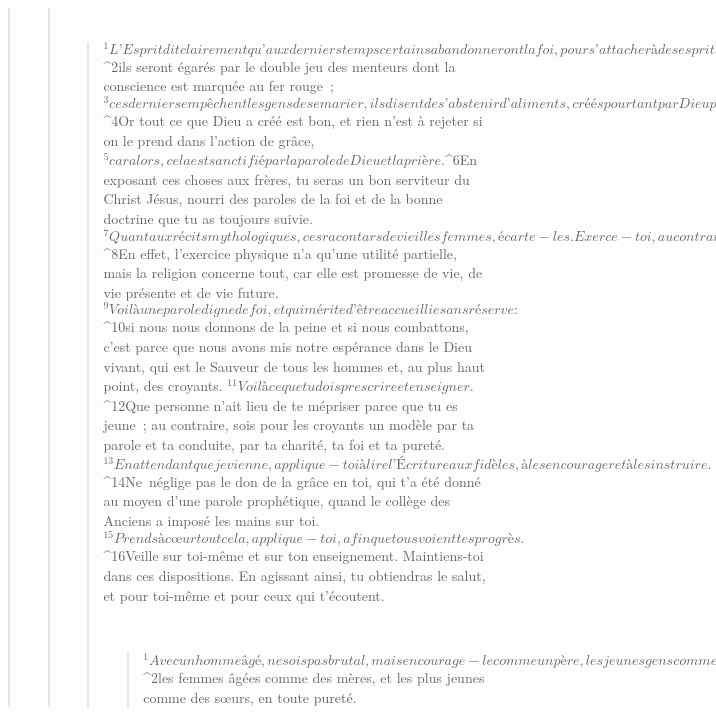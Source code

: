 \begin{verse}
\begin{verse}
         
      \bchapter{}
      \begin{verse}
${}^{1}L’Esprit dit clairement qu’aux derniers temps certains abandonneront la foi, pour s’attacher à des esprits trompeurs, à des doctrines démoniaques ; 
${}^{2}ils seront égarés par le double jeu des menteurs dont la conscience est marquée au fer rouge ; 
${}^{3}ces derniers empêchent les gens de se marier, ils disent de s’abstenir d’aliments, créés pourtant par Dieu pour être consommés dans l’action de grâce par ceux qui sont croyants et connaissent pleinement la vérité. 
${}^{4}Or tout ce que Dieu a créé est bon, et rien n’est à rejeter si on le prend dans l’action de grâce, 
${}^{5}car alors, cela est sanctifié par la parole de Dieu et la prière.
${}^{6}En exposant ces choses aux frères, tu seras un bon serviteur du Christ Jésus, nourri des paroles de la foi et de la bonne doctrine que tu as toujours suivie. 
${}^{7}Quant aux récits mythologiques, ces racontars de vieilles femmes, écarte-les. Exerce-toi, au contraire, à la piété. 
${}^{8}En effet, l’exercice physique n’a qu’une utilité partielle, mais la religion concerne tout, car elle est promesse de vie, de vie présente et de vie future. 
${}^{9}Voilà une parole digne de foi, et qui mérite d’être accueillie sans réserve : 
${}^{10}si nous nous donnons de la peine et si nous combattons, c’est parce que nous avons mis notre espérance dans le Dieu vivant, qui est le Sauveur de tous les hommes et, au plus haut point, des croyants.
${}^{11}Voilà ce que tu dois prescrire et enseigner. 
${}^{12}Que personne n’ait lieu de te mépriser parce que tu es jeune ; au contraire, sois pour les croyants un modèle par ta parole et ta conduite, par ta charité, ta foi et ta pureté. 
${}^{13}En attendant que je vienne, applique-toi à lire l’Écriture aux fidèles, à les encourager et à les instruire. 
${}^{14}Ne néglige pas le don de la grâce en toi, qui t’a été donné au moyen d’une parole prophétique, quand le collège des Anciens a imposé les mains sur toi. 
${}^{15}Prends à cœur tout cela, applique-toi, afin que tous voient tes progrès. 
${}^{16}Veille sur toi-même et sur ton enseignement. Maintiens-toi dans ces dispositions. En agissant ainsi, tu obtiendras le salut, et pour toi-même et pour ceux qui t’écoutent.
      
         
      \bchapter{}
      \begin{verse}
${}^{1}Avec un homme âgé, ne sois pas brutal, mais encourage-le comme un père, les jeunes gens comme des frères, 
${}^{2}les femmes âgées comme des mères, et les plus jeunes comme des sœurs, en toute pureté.
      

\end{verse}
\end{verse}
\end{verse}
\end{verse}
